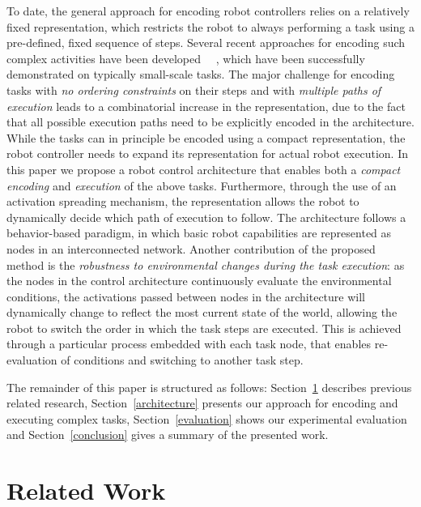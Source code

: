 \documentclass[conference]{article}
\begin{document}
To date, the general approach for encoding robot controllers relies on a relatively fixed representation, which restricts the robot to always performing a task using a pre-defined, fixed sequence of steps. Several recent approaches for encoding such complex activities have been developed ~\cite{Koppula-RSS-13}~\cite{hawkins2014}, which have been successfully demonstrated on typically small-scale tasks. The major challenge for encoding tasks with {\it no ordering constraints} on their steps and with {\it multiple paths of execution} leads to a combinatorial increase in the representation, due to the fact that all possible execution paths need to be explicitly encoded in the architecture. While the tasks can in principle be encoded using a compact representation, the robot controller needs to expand its representation for actual robot execution. In this paper we propose a robot control architecture that enables both a {\it compact encoding} and {\it execution} of the above tasks. Furthermore, through the use of an activation spreading mechanism, the representation allows the robot to dynamically decide which path of execution to follow. The architecture follows a behavior-based paradigm, in which basic robot capabilities are represented as nodes in an interconnected network. Another contribution of the proposed method is the {\it robustness to environmental changes during the task execution}: as the nodes in the control architecture continuously evaluate the environmental conditions, the activations passed between nodes in the architecture will dynamically change to reflect the most current state of the world, allowing the robot to switch the order in which the task steps are executed. This is achieved through a particular process embedded with each task node, that enables re-evaluation of conditions and switching to another task step.

The remainder of this paper is structured as follows: Section~\ref{relatedWork} describes previous related research, Section~\ref{architecture} presents our approach for encoding and executing complex tasks, Section~\ref{evaluation} shows our experimental evaluation and Section~\ref{conclusion} gives a summary of the presented work.

\section{Related Work}
\label{relatedWork}
\end{document}
